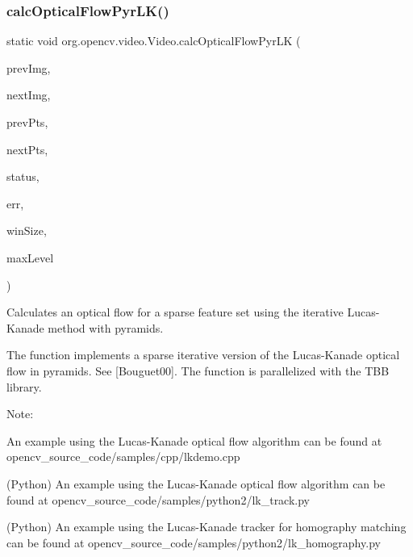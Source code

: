 \subsubsection{\texorpdfstring{calc\+Optical\+Flow\+Pyr\+L\+K()}{calcOpticalFlowPyrLK()}\hspace{0.1cm}{\footnotesize\ttfamily [2/3]}}
{\footnotesize\ttfamily static void org.\+opencv.\+video.\+Video.\+calc\+Optical\+Flow\+Pyr\+LK (\begin{DoxyParamCaption}\item[{\mbox{\hyperlink{classorg_1_1opencv_1_1core_1_1_mat}{Mat}}}]{prev\+Img,  }\item[{\mbox{\hyperlink{classorg_1_1opencv_1_1core_1_1_mat}{Mat}}}]{next\+Img,  }\item[{\mbox{\hyperlink{classorg_1_1opencv_1_1core_1_1_mat_of_point2f}{Mat\+Of\+Point2f}}}]{prev\+Pts,  }\item[{\mbox{\hyperlink{classorg_1_1opencv_1_1core_1_1_mat_of_point2f}{Mat\+Of\+Point2f}}}]{next\+Pts,  }\item[{\mbox{\hyperlink{classorg_1_1opencv_1_1core_1_1_mat_of_byte}{Mat\+Of\+Byte}}}]{status,  }\item[{\mbox{\hyperlink{classorg_1_1opencv_1_1core_1_1_mat_of_float}{Mat\+Of\+Float}}}]{err,  }\item[{\mbox{\hyperlink{classorg_1_1opencv_1_1core_1_1_size}{Size}}}]{win\+Size,  }\item[{int}]{max\+Level }\end{DoxyParamCaption})\hspace{0.3cm}{\ttfamily [static]}}

Calculates an optical flow for a sparse feature set using the iterative Lucas-\/\+Kanade method with pyramids.

The function implements a sparse iterative version of the Lucas-\/\+Kanade optical flow in pyramids. See \mbox{[}Bouguet00\mbox{]}. The function is parallelized with the T\+BB library.

Note\+:


\begin{DoxyItemize}
\item An example using the Lucas-\/\+Kanade optical flow algorithm can be found at opencv\+\_\+source\+\_\+code/samples/cpp/lkdemo.\+cpp 
\item (Python) An example using the Lucas-\/\+Kanade optical flow algorithm can be found at opencv\+\_\+source\+\_\+code/samples/python2/lk\+\_\+track.\+py 
\item (Python) An example using the Lucas-\/\+Kanade tracker for homography matching can be found at opencv\+\_\+source\+\_\+code/samples/python2/lk\+\_\+homography.\+py 
\end{DoxyItemize}


